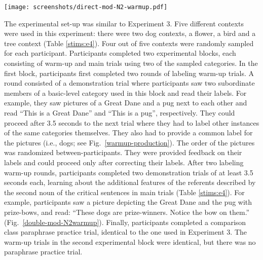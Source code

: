 \begin{figure*}[t]
	\begin{center}
		\texttt{[image: screenshots/direct-mod-N2-warmup.pdf]}
	\end{center}
	\vspace{-2cm}
	\caption{Experiment 4 feature demonstration trial: Participants learn about additional features of the referents used on one critical main trial. For the dog-context participants learn that the pug and the Great Dane are prize-winners, indicated by bows on them.}
	\label{double-mod-N2warmup}
\end{figure*} 
The experimental set-up was similar to Experiment 3. Five different contexts were used in this experiment: there were two dog contexts, a flower, a bird and a tree context (Table \ref{stims:e4}). Four out of five contexts were randomly sampled for each participant.  Participants completed two experimental blocks, each consisting of warm-up and main trials using two of the sampled categories. In the first block, participants first completed two rounds of labeling warm-up trials. A round consisted of a demonstration trial where participants saw two subordinate members of a basic-level category used in this block and read their labels. For example, they saw pictures of a Great Dane and a pug next to each other and read “This is a Great Dane” and “This is a pug”, respectively. They could proceed after 3.5 seconds to the next trial where they had to label other instances of the same categories themselves. They also had to provide a common label for the pictures (i.e., dogs; see Fig.~\ref{warmup-production}). The order of the pictures was randomized between-participants. They were provided feedback on their labels and could proceed only after correcting their labels.  After two labeling warm-up rounds, participants completed two demonstration trials of at least 3.5 seconds each, learning about the additional features of the referents described by the second noun of the critical sentences in main trials (Table \ref{stims:e4}). For example, participants saw a picture depicting the Great Dane and the pug with prize-bows, and read: “These dogs are prize-winners. Notice the bow on them.” (Fig.~\ref{double-mod-N2warmup}). Finally, participants completed a comparison class paraphrase practice trial, identical to the one used in Experiment 3. The warm-up trials in the second experimental block were identical, but there was no paraphrase practice trial.  

